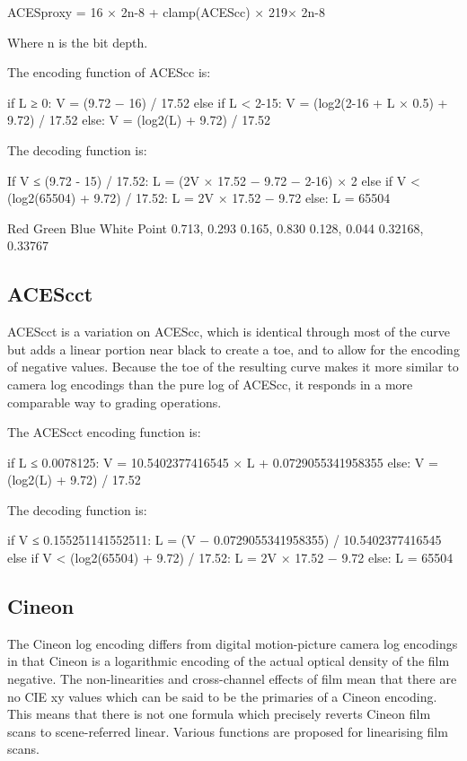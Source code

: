 	ACESproxy = 16 × 2n-8 + clamp(ACEScc) × 219× 2n-8

Where n is the bit depth.

The encoding function of ACEScc is:

	if L ≥ 0:
		V = (9.72 − 16) / 17.52
	else if L < 2-15:
		V = (log2(2-16 + L × 0.5) + 9.72) / 17.52
	else:
		V = (log2(L) + 9.72) / 17.52



The decoding function is:

	If V ≤ (9.72 - 15) / 17.52:
		L = (2V × 17.52 − 9.72 − 2-16) × 2
	else if V < (log2(65504) + 9.72) / 17.52:
		L = 2V × 17.52 − 9.72
	else:
		L = 65504


Red
Green
Blue
White Point
0.713, 0.293
0.165, 0.830
0.128, 0.044
0.32168, 0.33767

\subsection{ACEScct}
\label{subsec:acescct}
ACEScct is a variation on ACEScc, which is identical through most of the curve but adds a linear portion near black to create a toe, and to allow for the encoding of negative values. Because the toe of the resulting curve makes it more similar to camera log encodings than the pure log of ACEScc, it responds in a more comparable way to grading operations.

The ACEScct encoding function is:

	if L ≤ 0.0078125:
		V = 10.5402377416545 × L + 0.0729055341958355
	else:
		V = (log2(L) + 9.72) / 17.52



The decoding function is:

	if V ≤ 0.155251141552511:
		L = (V − 0.0729055341958355) / 10.5402377416545
	else if V < (log2(65504) + 9.72) / 17.52:
		L = 2V × 17.52 − 9.72
	else:
		L = 65504

\subsection{Cineon}
\label{subsec:cineon}

The Cineon log encoding differs from digital motion-picture camera log encodings in that Cineon is a logarithmic encoding of the actual optical density of the film negative. The non-linearities and cross-channel effects of film mean that there are no CIE xy values which can be said to be the primaries of a Cineon encoding. This means that there is not one formula which precisely reverts Cineon film scans to scene-referred linear. Various functions are proposed for linearising film scans.

